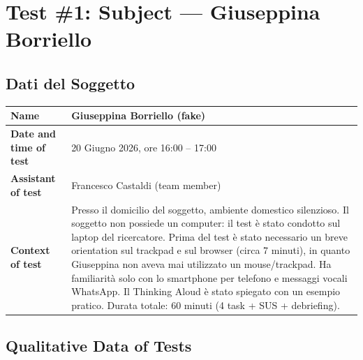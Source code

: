 \documentclass[11pt,a4paper]{article}
\begin{document}
\vspace{0.5cm}

\section{Test \#1: Subject --- Giuseppina Borriello}

\subsection{Dati del Soggetto}

\begin{tcolorbox}[colback=backgroundColor,colframe=borderColor,arc=2mm]
\small

\begin{tabular}{|L{3.5cm}|L{11cm}|}
\hline
\textbf{Name} & Giuseppina Borriello (fake) \\
\hline
\textbf{Date and time of test} & 20 Giugno 2026, ore 16:00 -- 17:00 \\
\hline
\textbf{Assistant of test} & Francesco Castaldi (team member) \\
\hline
\textbf{Context of test} & Presso il domicilio del soggetto, ambiente domestico silenzioso. Il soggetto non possiede un computer: il test \`e stato condotto sul laptop del ricercatore. Prima del test \`e stato necessario un breve orientation sul trackpad e sul browser (circa 7 minuti), in quanto Giuseppina non aveva mai utilizzato un mouse/trackpad. Ha familiarit\`a solo con lo smartphone per telefono e messaggi vocali WhatsApp. Il Thinking Aloud \`e stato spiegato con un esempio pratico. Durata totale: 60 minuti (4 task + SUS + debriefing). \\
\hline
\end{tabular}

\end{tcolorbox}

\vspace{0.3cm}

\subsection{Qualitative Data of Tests}
\end{document}
